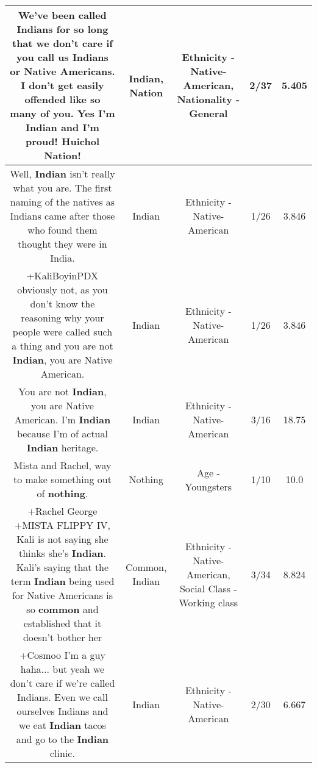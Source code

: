 \documentclass[11pt]{article}
\newlength\mylength
\begin{document}
\begin{center}
\begin{longtable}{|C{.65\mylength}|C{.30\mylength}|C{.12\mylength}|C{.12\mylength}|C{.12\mylength}|}
  \small We've been called Indians for so long that we don't care if you call us Indians or Native Americans. I don't get easily offended like so many of you. Yes I'm \textbf{Indian} and I'm proud! Huichol \textbf{Nation}!\normalsize   & Indian, Nation & Ethnicity - Native-American, Nationality - General & 2/37 & 5.405 \\  \hline
  \small Well, \textbf{Indian} isn't really what you are. The first naming of the natives as Indians came after those who found them thought they were in India.\normalsize   & Indian & Ethnicity - Native-American & 1/26 & 3.846 \\  \hline
  \small +KaliBoyinPDX obviously not, as you don't know the reasoning why your people were called such a thing and you are not \textbf{Indian}, you are Native American.\normalsize   & Indian & Ethnicity - Native-American & 1/26 & 3.846 \\  \hline
  \small You are not \textbf{Indian}, you are Native American. I'm \textbf{Indian} because I'm of actual \textbf{Indian} heritage.\normalsize   & Indian & Ethnicity - Native-American & 3/16 & 18.75 \\  \hline
  \small Mista and Rachel, way to make something out of \textbf{nothing}.\normalsize   & Nothing & Age - Youngsters & 1/10 & 10.0 \\  \hline
  \small +Rachel George +MISTA FLIPPY IV, Kali is not saying she thinks she's \textbf{Indian}. Kali's saying that the term \textbf{Indian} being used for Native Americans is so \textbf{common} and established that it doesn't bother her\normalsize   & Common, Indian & Ethnicity - Native-American, Social Class - Working class & 3/34 & 8.824 \\  \hline
  \small +Cosmoo I'm a guy haha... but yeah we don't care if we're called Indians. Even we call ourselves Indians and we eat \textbf{Indian} tacos and go to the \textbf{Indian} clinic.\normalsize   & Indian & Ethnicity - Native-American & 2/30 & 6.667 \\  \hline

\end{longtable}
\end{center}
\end{document}
